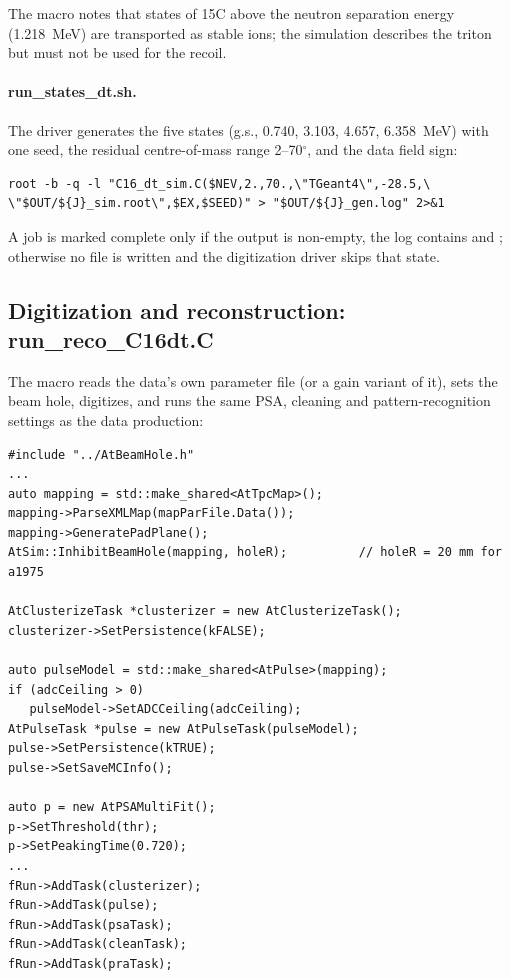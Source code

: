 The macro notes that states of 15C above the neutron separation energy (1.218~MeV) are transported
as stable ions; the simulation describes the triton but must not be used for the recoil.

\paragraph{run\_states\_dt.sh.} The driver generates the five states (g.s., 0.740, 3.103, 4.657,
6.358~MeV) with one seed, the residual centre-of-mass range 2--70$^\circ$, and the data field sign:

\begin{verbatim}
root -b -q -l "C16_dt_sim.C($NEV,2.,70.,\"TGeant4\",-28.5,\
\"$OUT/${J}_sim.root\",$EX,$SEED)" > "$OUT/${J}_gen.log" 2>&1
\end{verbatim}

A job is marked complete only if the output is non-empty, the log contains
\code{"RNG seed requested: \$SEED"} and ; otherwise no
\code{.marker} file is written and the digitization driver skips that state.

\subsection{Digitization and reconstruction: run\_reco\_C16dt.C}

The macro reads the data's own parameter file (or a gain variant of it), sets the beam hole,
digitizes, and runs the same PSA, cleaning and pattern-recognition settings as the data
production:

\begin{verbatim}
#include "../AtBeamHole.h"
...
auto mapping = std::make_shared<AtTpcMap>();
mapping->ParseXMLMap(mapParFile.Data());
mapping->GeneratePadPlane();
AtSim::InhibitBeamHole(mapping, holeR);          // holeR = 20 mm for a1975

AtClusterizeTask *clusterizer = new AtClusterizeTask();
clusterizer->SetPersistence(kFALSE);

auto pulseModel = std::make_shared<AtPulse>(mapping);
if (adcCeiling > 0)
   pulseModel->SetADCCeiling(adcCeiling);
AtPulseTask *pulse = new AtPulseTask(pulseModel);
pulse->SetPersistence(kTRUE);
pulse->SetSaveMCInfo();

auto p = new AtPSAMultiFit();
p->SetThreshold(thr);
p->SetPeakingTime(0.720);
...
fRun->AddTask(clusterizer);
fRun->AddTask(pulse);
fRun->AddTask(psaTask);
fRun->AddTask(cleanTask);
fRun->AddTask(praTask);
\end{verbatim}

